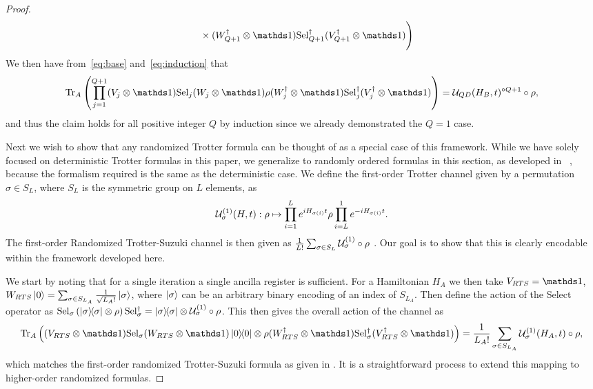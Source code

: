 \begin{proof}
\begin{align}
    & \qquad \times (W_{Q+1}^\dagger\otimes \openone){\rm Sel}_{Q+1}^\dagger (V_{Q+1}^\dagger\otimes \openone) \Biggr)\label{eq:induction}
\end{align}
We then have from~\eqref{eq:base} and~\eqref{eq:induction} that
\begin{equation}
    {\rm Tr}_{A} \left(\prod_{j=1}^{Q+1} (V_j\otimes \openone) {\rm Sel}_j (W_j\otimes \openone) \rho (W_j^\dagger\otimes \openone){\rm Sel}_j^\dagger (V_j^\dagger\otimes \openone)\right) = \qdchan(H_B, t)^{\circ Q+1} \circ \rho,
\end{equation}
and thus the claim holds for all positive integer $Q$ by induction since we already demonstrated the $Q=1$ case.

Next we wish to show that any randomized Trotter formula can be thought of as a special case of this framework.  While we have solely focused on deterministic Trotter formulas in this paper, we generalize to randomly ordered formulas in this section, as developed in ~\cite{childs2019faster}, because the formalism required is the same as the deterministic case. We define the first-order Trotter channel given by a permutation $\sigma \in S_L$, where $S_L$ is the symmetric group on $L$ elements, as 
\begin{equation}
    \mathcal{U}_{\sigma}^{(1)}(H, t) : \rho \mapsto \prod_{i = 1}^{L} e^{i H_{\sigma(i)} t} \rho \prod_{i = L}^{1} e^{-i H_{\sigma(i)}t}.
\end{equation}
The first-order Randomized Trotter-Suzuki channel is then given as $\frac{1}{L!} \sum_{\sigma \in S_L} \mathcal{U}_{\sigma}^{(1)} \circ \rho$ . Our goal is to show that this is clearly encodable within the framework developed here.

We start by noting that for a single iteration a single ancilla register is sufficient. For a Hamiltonian $H_A$ we then take $V_{RTS} = \openone$, $W_{RTS} \ket{0} = \sum_{\sigma \in S_{L_A}} \frac{1}{\sqrt{L_A!}} \ket{\sigma}$, where $\ket{\sigma}$ can be an arbitrary binary encoding of an index of $S_{L_A}$. Then define the action of the Select operator as ${\rm Sel_\sigma} \left( \ketbra{\sigma}{\sigma} \otimes \rho \right) {\rm Sel_{\sigma}^\dagger} = \ketbra{\sigma}{\sigma} \otimes \mathcal{U}_{\sigma}^{(1)} \circ \rho $. This then gives the overall action of the channel as
\begin{equation}
    {\rm Tr}_{A} \parens{ (V_{RTS} \otimes \openone) {\rm Sel_{\sigma}} (W_{RTS} \otimes \openone) \ketbra{0}{0} \otimes \rho (W_{RTS}^\dagger \otimes \openone) {\rm Sel_{\sigma}^\dagger} (V_{RTS}^\dagger \otimes \openone)} = \frac{1}{L_A!} \sum_{\sigma \in S_{L_A}} \capU_{\sigma}^{(1)}(H_A, t) \circ \rho,
\end{equation}
which matches the first-order randomized Trotter-Suzuki formula as given in \cite{childs2019faster}. It is a straightforward process to extend this mapping to higher-order randomized formulas.


\end{proof}
